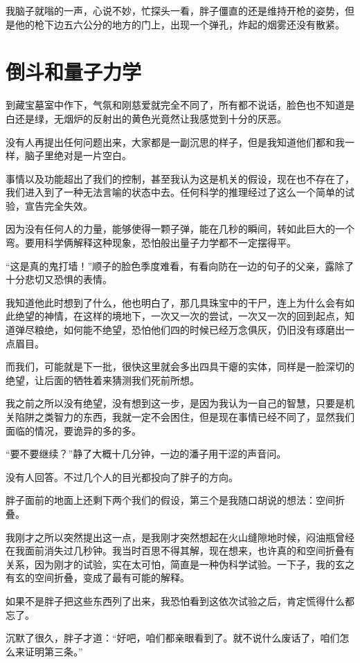 我脑子就嗡的一声，心说不妙，忙探头一看，胖子僵直的还是维持开枪的姿势，但是他的枪下边五六公分的地方的门上，出现一个弹孔，炸起的烟雾还没有散紧。

\chapter{倒斗和量子力学}

到藏宝墓室中作下，气氛和刚慈爱就完全不同了，所有都不说话，脸色也不知道是白还是绿，无烟炉的反射出的黄色光竟然让我感觉到十分的厌恶。

没有人再提出任何问题出来，大家都是一副沉思的样子，但是我知道他们都和我一样，脑子里绝对是一片空白。

事情以及功能超出了我们的控制，甚至我认为这是机关的假设，现在也不存在了，我们进入到了一种无法言喻的状态中去。任何科学的推理经过了这么一个简单的试验，宣告完全失效。

因为没有任何人的力量，能够使得一颗子弹，能在几秒的瞬间，转如此巨大的一个弯。要用科学俩解释这种现象，恐怕般出量子力学都不一定摆得平。

“这是真的鬼打墙！”顺子的脸色季度难看，有看向防在一边的句子的父亲，露除了十分悲切又恐惧的表情。

我知道他此时想到了什么，他也明白了，那几具珠宝中的干尸，连上为什么会有如此绝望的神情，在这样的境地下，一次又一次的尝试，一次又一次的回到起点，知道弹尽粮绝，如何能不绝望，恐怕他们四的时候已经万念俱灰，仍旧没有琢磨出一点眉目。

而我们，可能就是下一批，很快这里就会多出四具干瘪的实体，同样是一脸深切的绝望，让后面的牺牲着来猜测我们死前所想。

我之前之所以没有绝望，没有想到这一步，是因为我认为一自己的智慧，只要是机关陷阱之类智力的东西，我就一定不会困住，但是现在事情已经不同了，显然我们面临的情况，要诡异的多的多。

“要不要继续？”静了大概十几分钟，一边的潘子用干涩的声音问。

没有人回答。不过几个人的目光都投向了胖子的方向。

胖子面前的地面上还剩下两个我们的假设，第三个是我随口胡说的想法：空间折叠。

我刚才之所以突然提出这一点，是我刚才突然想起在火山缝隙地时候，闷油瓶曾经在我面前消失过几秒钟。我当时百思不得其解，现在想来，也许真的和空间折叠有关系，因为刚才的试验，实在太可怕，简直是一种伪科学试验。一下子，我的玄之有玄的空间折叠，变成了最有可能的解释。

如果不是胖子把这些东西列了出来，我恐怕看到这依次试验之后，肯定慌得什么都忘了。

沉默了很久，胖子才道：“好吧，咱们都亲眼看到了。就不说什么废话了，咱们怎么来证明第三条。”

